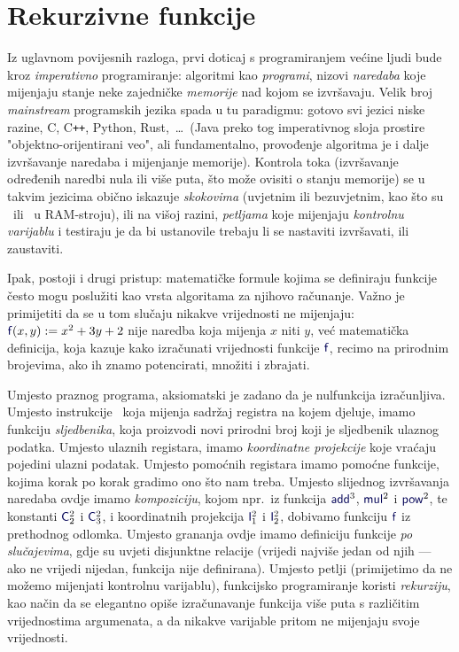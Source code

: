 \chapter{Rekurzivne funkcije}

Iz uglavnom povijesnih razloga, prvi doticaj s programiranjem većine ljudi bude kroz \emph{imperativno} programiranje: algoritmi kao \emph{programi}, nizovi \emph{naredaba} koje mijenjaju stanje neke zajedničke \emph{memorije} nad kojom se izvršavaju. Velik broj \emph{mainstream} programskih jezika spada u tu paradigmu: gotovo svi jezici niske razine, C, C\texttt{++}, Python, Rust,~\ldots\ (Java preko tog imperativnog sloja prostire "objektno-orijentirani veo", ali fundamentalno, provođenje algoritma je i dalje izvršavanje naredaba i mijenjanje memorije). Kontrola toka (izvršavanje određenih naredbi nula ili više puta, što može ovisiti o stanju memorije) se u takvim jezicima obično iskazuje \emph{skokovima} (uvjetnim ili bezuvjetnim, kao što su \dec\ ili \goto\ u RAM-stroju), ili na višoj razini, \emph{petljama} koje mijenjaju \emph{kontrolnu varijablu} i testiraju je da bi ustanovile trebaju li se nastaviti izvršavati, ili zaustaviti.

Ipak, postoji i drugi pristup: matematičke formule kojima se definiraju funkcije često mogu poslužiti kao vrsta algoritama za njihovo računanje. Važno je primijetiti da se u tom slučaju nikakve vrijednosti ne mijenjaju: $\f f(x,y):=x^2+3y+2$ nije naredba koja mijenja $x$ niti $y$, već matematička definicija, koja kazuje kako izračunati vrijednosti funkcije $\f f$, recimo na prirodnim brojevima, ako ih znamo potencirati, množiti i zbrajati.

Umjesto praznog programa, aksiomatski je zadano da je nulfunkcija izračunljiva. Umjesto instrukcije \inc\ koja mijenja sadržaj registra na kojem djeluje, imamo funkciju \emph{sljedbenika}, koja proizvodi novi prirodni broj koji je sljedbenik ulaznog podatka. Umjesto ulaznih registara, imamo \emph{koordinatne projekcije} koje vraćaju pojedini ulazni podatak. Umjesto pomoćnih registara imamo pomoćne funkcije, kojima korak po korak gradimo ono što nam treba. Umjesto slijednog izvršavanja naredaba ovdje imamo \emph{kompoziciju}, kojom npr.\ iz funkcija $\f{add}^3$, $\f{mul}^2$ i $\f{pow}^2$, te konstanti $\f C_2^2$ i $\f C_3^2$, i koordinatnih projekcija $\f I_1^2$ i $\f I_2^2$, dobivamo funkciju $\f f$ iz prethodnog odlomka. Umjesto grananja ovdje imamo definiciju funkcije \emph{po slučajevima}, gdje su uvjeti disjunktne relacije (vrijedi najviše jedan od njih --- ako ne vrijedi nijedan, funkcija nije definirana). Umjesto petlji (primijetimo da ne možemo mijenjati kontrolnu varijablu), funkcijsko programiranje koristi \emph{rekurziju}, kao način da se elegantno opiše izračunavanje funkcija više puta s različitim vrijednostima argumenata, a da nikakve varijable pritom ne mijenjaju svoje vrijednosti. 

